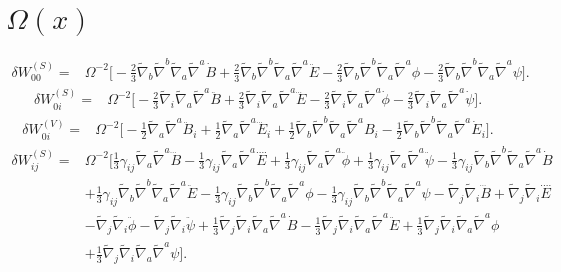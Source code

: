 \documentclass[10pt,letterpaper]{article}
\begin{document}
\section*{ $\Omega(x)$}
\begin{align}
\delta W_{00}^{(S)}={}&\Omega^{-2}\big[- \tfrac{2}{3} \tilde{\nabla}_{b}\tilde{\nabla}^{b}\tilde{\nabla}_{a}\tilde{\nabla}^{a}\dot{B}
 + \tfrac{2}{3} \tilde{\nabla}_{b}\tilde{\nabla}^{b}\tilde{\nabla}_{a}\tilde{\nabla}^{a}\ddot{E}
 -  \tfrac{2}{3} \tilde{\nabla}_{b}\tilde{\nabla}^{b}\tilde{\nabla}_{a}\tilde{\nabla}^{a}\phi
 -  \tfrac{2}{3} \tilde{\nabla}_{b}\tilde{\nabla}^{b}\tilde{\nabla}_{a}\tilde{\nabla}^{a}\psi\big].
\end{align}
\begin{align}
\delta W_{0i}^{(S)}={}&\Omega^{-2}\big[- \tfrac{2}{3} \tilde{\nabla}_{i}\tilde{\nabla}_{a}\tilde{\nabla}^{a}\ddot{B}
 + \tfrac{2}{3} \tilde{\nabla}_{i}\tilde{\nabla}_{a}\tilde{\nabla}^{a}\dddot{E}
 -  \tfrac{2}{3} \tilde{\nabla}_{i}\tilde{\nabla}_{a}\tilde{\nabla}^{a}\dot{\phi}
 -  \tfrac{2}{3} \tilde{\nabla}_{i}\tilde{\nabla}_{a}\tilde{\nabla}^{a}\dot{\psi}\big].
\end{align}
\begin{align}
\delta W_{0i}^{(V)}={}&\Omega^{-2}\big[- \tfrac{1}{2} \tilde{\nabla}_{a}\tilde{\nabla}^{a}\ddot{B}_{i}
 + \tfrac{1}{2} \tilde{\nabla}_{a}\tilde{\nabla}^{a}\dddot{E}_{i}
 + \tfrac{1}{2} \tilde{\nabla}_{b}\tilde{\nabla}^{b}\tilde{\nabla}_{a}\tilde{\nabla}^{a}B_{i}
 -  \tfrac{1}{2} \tilde{\nabla}_{b}\tilde{\nabla}^{b}\tilde{\nabla}_{a}\tilde{\nabla}^{a}\dot{E}_{i}\big].
\end{align}
\begin{align}
\delta W_{ij}^{(S)}={}&\Omega^{-2}\big[\tfrac{1}{3} \gamma_{ij} \tilde{\nabla}_{a}\tilde{\nabla}^{a}\dddot{B}
 -  \tfrac{1}{3} \gamma_{ij} \tilde{\nabla}_{a}\tilde{\nabla}^{a}\overset{\text{...}.}{E}
 + \tfrac{1}{3} \gamma_{ij} \tilde{\nabla}_{a}\tilde{\nabla}^{a}\ddot{\phi}
 + \tfrac{1}{3} \gamma_{ij} \tilde{\nabla}_{a}\tilde{\nabla}^{a}\ddot{\psi}
 -  \tfrac{1}{3} \gamma_{ij} \tilde{\nabla}_{b}\tilde{\nabla}^{b}\tilde{\nabla}_{a}\tilde{\nabla}^{a}\dot{B}\nonumber\\
& + \tfrac{1}{3} \gamma_{ij} \tilde{\nabla}_{b}\tilde{\nabla}^{b}\tilde{\nabla}_{a}\tilde{\nabla}^{a}\ddot{E}
 -  \tfrac{1}{3} \gamma_{ij} \tilde{\nabla}_{b}\tilde{\nabla}^{b}\tilde{\nabla}_{a}\tilde{\nabla}^{a}\phi
 -  \tfrac{1}{3} \gamma_{ij} \tilde{\nabla}_{b}\tilde{\nabla}^{b}\tilde{\nabla}_{a}\tilde{\nabla}^{a}\psi
 -  \tilde{\nabla}_{j}\tilde{\nabla}_{i}\dddot{B}
 + \tilde{\nabla}_{j}\tilde{\nabla}_{i}\overset{\text{...}.}{E}\nonumber\\
& -  \tilde{\nabla}_{j}\tilde{\nabla}_{i}\ddot{\phi}
 -  \tilde{\nabla}_{j}\tilde{\nabla}_{i}\ddot{\psi}
 + \tfrac{1}{3} \tilde{\nabla}_{j}\tilde{\nabla}_{i}\tilde{\nabla}_{a}\tilde{\nabla}^{a}\dot{B}
 -  \tfrac{1}{3} \tilde{\nabla}_{j}\tilde{\nabla}_{i}\tilde{\nabla}_{a}\tilde{\nabla}^{a}\ddot{E}
 + \tfrac{1}{3} \tilde{\nabla}_{j}\tilde{\nabla}_{i}\tilde{\nabla}_{a}\tilde{\nabla}^{a}\phi\nonumber\\
& + \tfrac{1}{3} \tilde{\nabla}_{j}\tilde{\nabla}_{i}\tilde{\nabla}_{a}\tilde{\nabla}^{a}\psi\big].
\end{align}
\end{document}

